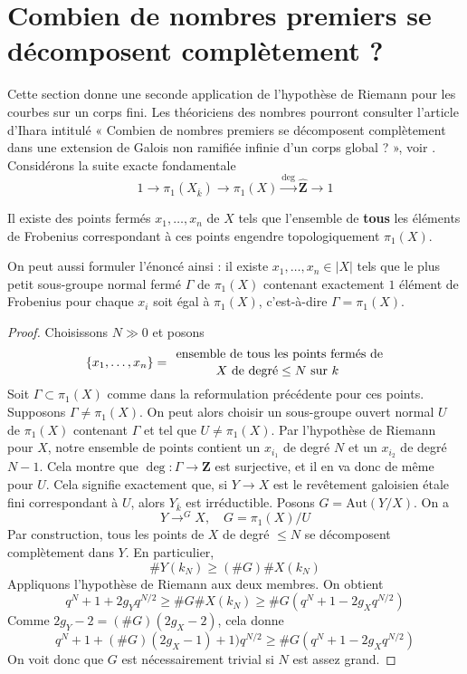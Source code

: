 \section{Combien de nombres premiers se décomposent complètement ?}
\label{section-how-many}

\noindent
Cette section donne une seconde application de l'hypothèse de Riemann pour les
courbes sur un corps fini. Les théoriciens des nombres pourront consulter
l'article d'Ihara intitulé
« Combien de nombres premiers se décomposent complètement dans une extension de Galois
non ramifiée infinie d'un corps global ? », voir \cite{Ihara}.
Considérons la suite exacte fondamentale
$$
1 \to
\pi_1(X_{\overline{k}}) \to
\pi_1(X) \xrightarrow{\deg}
\widehat{\mathbf{Z}} \to 1
$$

\begin{proposition}
\label{proposition-finite-set-frobenii-generate-topologically}
Il existe des points fermés $x_1, \ldots, x_n$ de $X$
tels que l'ensemble de {\bf tous} les éléments de Frobenius correspondant à ces
points engendre topologiquement $\pi_1(X)$.
\end{proposition}

\noindent
On peut aussi formuler l'énoncé ainsi :
il existe $x_1, \ldots, x_n\in |X|$ tels que
le plus petit sous-groupe normal fermé $\Gamma$ de $\pi_1(X)$
contenant exactement $1$ élément de Frobenius pour chaque $x_i$ soit égal à $\pi_1(X)$, c'est-à-dire
$\Gamma = \pi_1(X)$.

\begin{proof}
Choisissons $N\gg 0$ et posons
$$
\{x_1, \ldots, x_n\} =
{\text{ ensemble de tous les points fermés de}
\atop X \text{ de degré} \leq N\text{ sur } k}
$$
Soit $\Gamma\subset \pi_1(X)$ comme dans la reformulation précédente pour ces
points. Supposons $\Gamma \neq \pi_1(X)$. On peut alors choisir un sous-groupe ouvert normal
$U$ de $\pi_1(X)$ contenant $\Gamma$ et tel que
$U \neq \pi_1(X)$. Par l'hypothèse de Riemann pour $X$, notre ensemble de points contient un
$x_{i_1}$ de degré $N$ et un $x_{i_2}$ de degré $N - 1$. Cela montre que
$\deg : \Gamma \to \widehat{\mathbf{Z}}$ est surjective,
et il en va donc de même pour $U$. Cela signifie exactement que, si
$Y \to X$ est le revêtement galoisien étale fini
correspondant à $U$, alors $Y_{\overline{k}}$ est irréductible.
Posons $G = \text{Aut}(Y/X)$. On a
$$
Y \to^G X,\quad G = \pi_1(X)/U
$$
Par construction, tous les points de $X$ de degré $\leq N$ se décomposent
complètement dans $Y$. En particulier,
$$
\# Y(k_N)\geq (\# G)\# X(k_N)
$$
Appliquons l'hypothèse de Riemann aux deux membres. On obtient
$$
q^N+1+2g_Yq^{N/2}\geq \# G\# X(k_N)\geq \#
G(q^N+1-2g_Xq^{N/2})
$$
Comme $2g_Y-2 = (\# G)(2g_X-2)$, cela donne
$$
q^N + 1 + (\# G)(2g_X - 1) + 1)q^{N/2}\geq
\# G (q^N + 1 - 2g_Xq^{N/2})
$$
On voit donc que $G$ est nécessairement trivial si $N$ est assez grand.
\end{proof}

